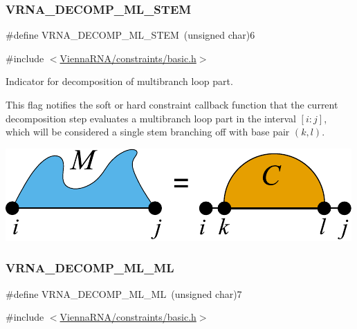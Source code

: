 \subsubsection{\texorpdfstring{VRNA\_DECOMP\_ML\_STEM}{VRNA\_DECOMP\_ML\_STEM}}
{\footnotesize\ttfamily \#define V\+R\+N\+A\+\_\+\+D\+E\+C\+O\+M\+P\+\_\+\+M\+L\+\_\+\+S\+T\+EM~(unsigned char)6}



{\ttfamily \#include $<$\mbox{\hyperlink{constraints_2basic_8h}{Vienna\+R\+N\+A/constraints/basic.\+h}}$>$}



Indicator for decomposition of multibranch loop part. 

This flag notifies the soft or hard constraint callback function that the current decomposition step evaluates a multibranch loop part in the interval $[i:j]$, which will be considered a single stem branching off with base pair $(k,l)$.

 
\begin{DoxyImageNoCaption}
  \mbox{\includegraphics[width=\textwidth,height=\textheight/2,keepaspectratio=true]{decomp_ml_stem}}
\end{DoxyImageNoCaption}
 \mbox{\label{group__constraints_ga7f4cb9ff7a33e67f0539bd39e7b19a78}} 
\subsubsection{\texorpdfstring{VRNA\_DECOMP\_ML\_ML}{VRNA\_DECOMP\_ML\_ML}}
{\footnotesize\ttfamily \#define V\+R\+N\+A\+\_\+\+D\+E\+C\+O\+M\+P\+\_\+\+M\+L\+\_\+\+ML~(unsigned char)7}



{\ttfamily \#include $<$\mbox{\hyperlink{constraints_2basic_8h}{Vienna\+R\+N\+A/constraints/basic.\+h}}$>$}



